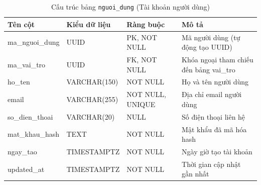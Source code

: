 \begin{table}[H]
  \centering
  \begin{tabularx}{\textwidth}{|l|l|l|>{\raggedright\arraybackslash}X|}
    \hline
    \textbf{Tên cột} & \textbf{Kiểu dữ liệu} & \textbf{Ràng buộc} & \textbf{Mô tả} \\
    \hline
    ma\_nguoi\_dung      & UUID            & PK, NOT NULL    & Mã người dùng (tự động tạo UUID) \\ \hline
    ma\_vai\_tro         & UUID            & FK, NOT NULL    & Khóa ngoại tham chiếu đến bảng vai\_tro \\ \hline
    ho\_ten              & VARCHAR(150)    & NOT NULL        & Họ và tên người dùng \\ \hline
    email                & VARCHAR(255)    & NOT NULL, UNIQUE & Địa chỉ email người dùng \\ \hline
    so\_dien\_thoai      & VARCHAR(20)     & NULL            & Số điện thoại liên hệ \\ \hline
    mat\_khau\_hash      & TEXT            & NOT NULL        & Mật khẩu đã mã hóa hash \\ \hline
    ngay\_tao            & TIMESTAMPTZ     & NOT NULL        & Ngày giờ tạo tài khoản \\ \hline
    updated\_at          & TIMESTAMPTZ     & NOT NULL        & Thời gian cập nhật gần nhất \\
    \hline
  \end{tabularx}
  \caption{Cấu trúc bảng \texttt{nguoi\_dung} (Tài khoản người dùng)}
  \label{tab:db-nguoi-dung}
\end{table}

